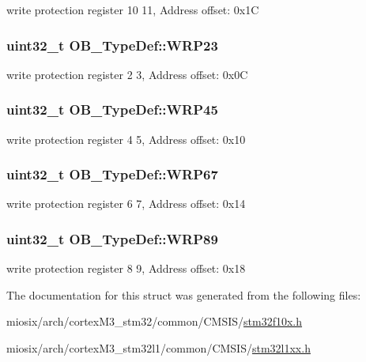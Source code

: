 write protection register 10 11, Address offset\-: 0x1\-C \hypertarget{struct_o_b___type_def_acaba2c9c4bd8bebe7b72f8ffc0bee63d}{
\subsubsection[{W\-R\-P23}]{ uint32\-\_\-t O\-B\-\_\-\-Type\-Def\-::\-W\-R\-P23}}\label{struct_o_b___type_def_acaba2c9c4bd8bebe7b72f8ffc0bee63d}
write protection register 2 3, Address offset\-: 0x0\-C \hypertarget{struct_o_b___type_def_a7e9fb00f640fdadfa2142c85b562467e}{
\subsubsection[{W\-R\-P45}]{ uint32\-\_\-t O\-B\-\_\-\-Type\-Def\-::\-W\-R\-P45}}\label{struct_o_b___type_def_a7e9fb00f640fdadfa2142c85b562467e}
write protection register 4 5, Address offset\-: 0x10 \hypertarget{struct_o_b___type_def_aeee96ac5e2dea75ccaec85ef502ec441}{
\subsubsection[{W\-R\-P67}]{ uint32\-\_\-t O\-B\-\_\-\-Type\-Def\-::\-W\-R\-P67}}\label{struct_o_b___type_def_aeee96ac5e2dea75ccaec85ef502ec441}
write protection register 6 7, Address offset\-: 0x14 \hypertarget{struct_o_b___type_def_a47af06105b059a6968c01b5c33e77f5c}{
\subsubsection[{W\-R\-P89}]{ uint32\-\_\-t O\-B\-\_\-\-Type\-Def\-::\-W\-R\-P89}}\label{struct_o_b___type_def_a47af06105b059a6968c01b5c33e77f5c}
write protection register 8 9, Address offset\-: 0x18 

The documentation for this struct was generated from the following files\-:\begin{DoxyCompactItemize}
\item 
miosix/arch/cortex\-M3\-\_\-stm32/common/\-C\-M\-S\-I\-S/\hyperlink{stm32f10x_8h}{stm32f10x.\-h}\item 
miosix/arch/cortex\-M3\-\_\-stm32l1/common/\-C\-M\-S\-I\-S/\hyperlink{stm32l1xx_8h}{stm32l1xx.\-h}\end{DoxyCompactItemize}

